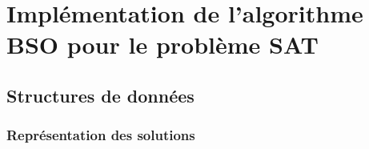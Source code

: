 \chapter{Implémentation de l'algorithme BSO pour le problème SAT}
	\section{Structures de données}
	\subsection{Représentation des solutions}
	\subsection{}

